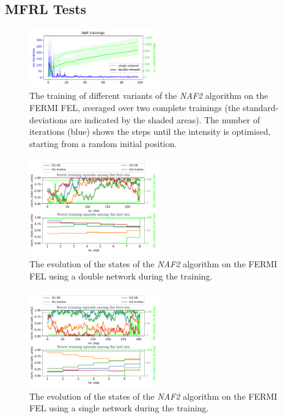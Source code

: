 \documentclass[
reprint,nofootinbib,
amsmath,amssymb,amsfonts,clevref,
aps,
prstab,
]{revtex4-2}
\begin{document}
	\subsection{MFRL Tests}
	\begin{figure}
		\centering
		\includegraphics*[width=0.5\textwidth]{Figures/FERMI_all_experiments_NAF_training_episodes.pdf}
		\caption{The training of different variants of the \emph{NAF2} algorithm  on the FERMI FEL, averaged over two complete trainings (the standard-deviations are indicated by the shaded areas). The number of iterations (blue) shows the steps until the intensity is optimised, starting from a random initial position.}
		\label{fig:NAF_training}
	\end{figure}
	\begin{figure}
		\centering
		\includegraphics*[width=0.5\textwidth]{Figures/Evolution_double.pdf}
		\caption{The evolution of the states of the \emph{NAF2} algorithm on the FERMI FEL using a double network during the training.}
		\label{fig:NAF_evolution_double}
	\end{figure}
	\begin{figure}
		\centering
		\includegraphics*[width=0.5\textwidth]{Figures/Evolution_single.pdf}
		\caption{The evolution of the states of the \emph{NAF2} algorithm on the FERMI FEL using a single network during the training.}
		\label{fig:NAF_evolution_single}
	\end{figure}
\end{document}
